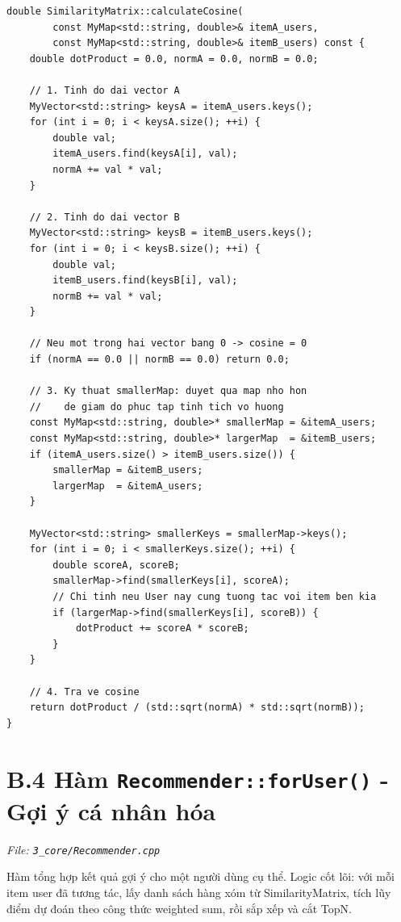 \documentclass{report}
\begin{document}
\begin{lstlisting}[caption={Hàm calculateCosine() tối ưu - File 3\_core/SimilarityMatrix.cpp}, label={lst:calc_cosine}]
double SimilarityMatrix::calculateCosine(
        const MyMap<std::string, double>& itemA_users,
        const MyMap<std::string, double>& itemB_users) const {
    double dotProduct = 0.0, normA = 0.0, normB = 0.0;

    // 1. Tinh do dai vector A
    MyVector<std::string> keysA = itemA_users.keys();
    for (int i = 0; i < keysA.size(); ++i) {
        double val;
        itemA_users.find(keysA[i], val);
        normA += val * val;
    }

    // 2. Tinh do dai vector B
    MyVector<std::string> keysB = itemB_users.keys();
    for (int i = 0; i < keysB.size(); ++i) {
        double val;
        itemB_users.find(keysB[i], val);
        normB += val * val;
    }

    // Neu mot trong hai vector bang 0 -> cosine = 0
    if (normA == 0.0 || normB == 0.0) return 0.0;

    // 3. Ky thuat smallerMap: duyet qua map nho hon
    //    de giam do phuc tap tinh tich vo huong
    const MyMap<std::string, double>* smallerMap = &itemA_users;
    const MyMap<std::string, double>* largerMap  = &itemB_users;
    if (itemA_users.size() > itemB_users.size()) {
        smallerMap = &itemB_users;
        largerMap  = &itemA_users;
    }

    MyVector<std::string> smallerKeys = smallerMap->keys();
    for (int i = 0; i < smallerKeys.size(); ++i) {
        double scoreA, scoreB;
        smallerMap->find(smallerKeys[i], scoreA);
        // Chi tinh neu User nay cung tuong tac voi item ben kia
        if (largerMap->find(smallerKeys[i], scoreB)) {
            dotProduct += scoreA * scoreB;
        }
    }

    // 4. Tra ve cosine
    return dotProduct / (std::sqrt(normA) * std::sqrt(normB));
}
\end{lstlisting}

\section*{B.4 Hàm \texttt{Recommender::forUser()} - Gợi ý cá nhân hóa}

\textit{File: \texttt{3\_core/Recommender.cpp}}

Hàm tổng hợp kết quả gợi ý cho một người dùng cụ thể. Logic cốt lõi: với mỗi item user đã tương tác, lấy danh sách hàng xóm từ SimilarityMatrix, tích lũy điểm dự đoán theo công thức weighted sum, rồi sắp xếp và cắt TopN.
\end{document}

